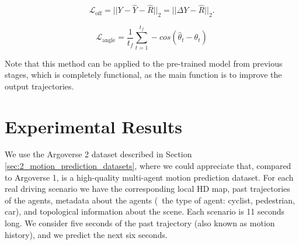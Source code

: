 \begin{equation}
	\label{eq:5_pose_error}
	\mathcal{L}_\text{off}= ||{Y} - \hat{Y} - \hat{R}||_2 = ||\Delta{Y} - \hat{R}||_2.
\end{equation}


\begin{equation}
	\mathcal{L}_{\text{angle}}=\frac{1}{t_{f}}\sum^{t_{f}}_{t=1}-cos(\hat{\theta}_{t}-\theta_{t})
	\label{eq:poseerror}
\end{equation}

Note that this method can be applied to the pre-trained model from previous stages, which is completely functional, as the main function is to improve the output trajectories.

\section{Experimental Results}
\label{sec:7_experimental_results}

We use the Argoverse 2 \cite{wilson2023argoverse} dataset described in Section \ref{sec:2_motion_prediction_datasets}, where we could appreciate that, compared to Argoverse 1, is a high-quality multi-agent motion prediction dataset. For each real driving scenario we have the corresponding local HD map, past trajectories of the agents, metadata about the agents (\eg \ the type of agent: cyclist, pedestrian, car), and topological information about the scene. Each scenario is 11 seconds long. We consider five seconds of the past trajectory (also known as motion history), and we predict the next six seconds. 


